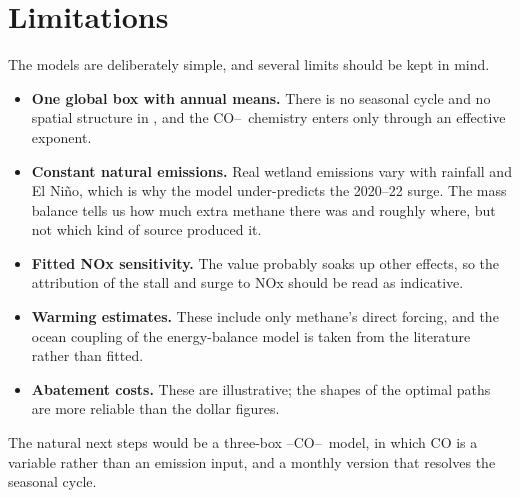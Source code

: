\documentclass[11pt,a4paper]{article}
\newcommand{\CH}{\ce{CH4}}
\newcommand{\OH}{\ce{OH}}
\begin{document}
\section{Limitations}
The models are deliberately simple, and several limits should be kept in mind.
\begin{itemize}\itemsep0pt
\item \textbf{One global box with annual means.} There is no seasonal cycle and no spatial structure in \OH, and the CO--\OH\ chemistry enters only through an effective exponent.
\item \textbf{Constant natural emissions.} Real wetland emissions vary with rainfall and El Ni\~no, which is why the model under-predicts the 2020--22 surge. The mass balance tells us how much extra methane there was and roughly where, but not which kind of source produced it.
\item \textbf{Fitted NOx sensitivity.} The value probably soaks up other effects, so the attribution of the stall and surge to NOx should be read as indicative.
\item \textbf{Warming estimates.} These include only methane's direct forcing, and the ocean coupling of the energy-balance model is taken from the literature rather than fitted.
\item \textbf{Abatement costs.} These are illustrative; the shapes of the optimal paths are more reliable than the dollar figures.
\end{itemize}
The natural next steps would be a three-box \CH--CO--\OH\ model, in which CO is a variable rather than an emission input, and a monthly version that resolves the seasonal cycle.
\end{document}
